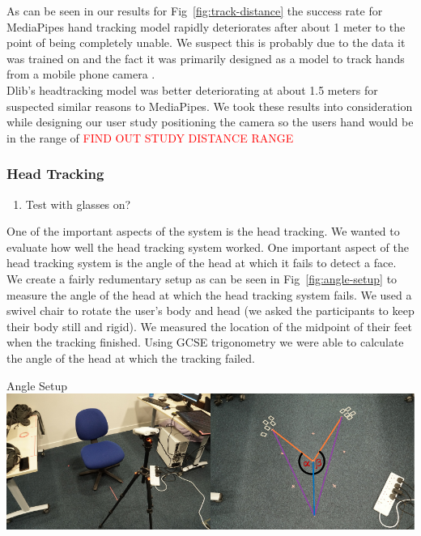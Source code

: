 As can be seen in our results for Fig~\ref{fig:track-distance} the success rate for MediaPipes hand tracking model rapidly deteriorates after about 1 meter to the point of being completely unable. We suspect this is probably due to the data it was trained on and the fact it was primarily designed as a model to track hands from a mobile phone camera \tocite. \\

Dlib's headtracking model was better deteriorating at about 1.5 meters for suspected similar reasons to MediaPipes. We took these results into consideration while designing our user study positioning the camera so the users hand would be in the range of \textcolor{red}{FIND OUT STUDY DISTANCE RANGE}

\subsubsection{Head Tracking}
\begin{enumerate}
	\item Test with glasses on?
\end{enumerate}

One of the important aspects of the system is the head tracking. We wanted to evaluate how well the head tracking system worked. One important aspect of the head tracking system is the angle of the head at which it fails to detect a face. We create a fairly redumentary setup as can be seen in Fig~\ref{fig:angle-setup} to measure the angle of the head at which the head tracking system fails. We used a swivel chair to rotate the user's body and head (we asked the participants to keep their body still and rigid). We measured the location of the midpoint of their feet when the tracking finished. Using GCSE trigonometry we were able to calculate the angle of the head at which the tracking failed. 

\begin{figureBox}[label={fig:angle-setup}, width=1.0\linewidth]{Angle Setup}
	\includegraphics[width = 1.0\linewidth]{./evaluation/figures/angle-setup.pdf}
\end{figureBox}

